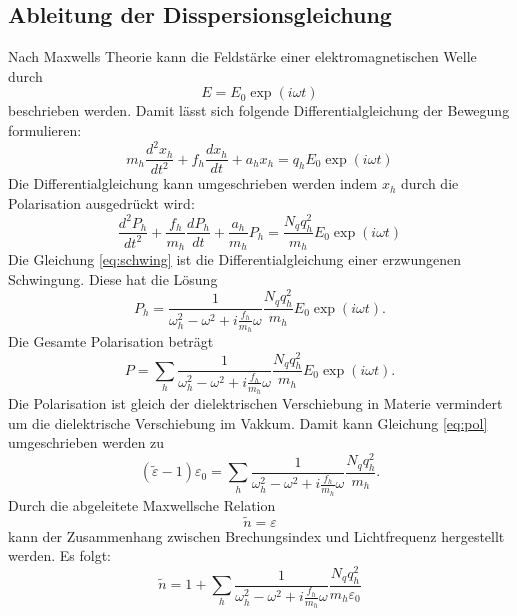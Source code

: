 \subsection{Ableitung der Disspersionsgleichung}
Nach Maxwells Theorie kann die Feldstärke einer elektromagnetischen Welle durch
\begin{equation}
  E = E_0 \exp(i\omega t)
\end{equation}
beschrieben werden.
Damit lässt sich folgende Differentialgleichung der Bewegung formulieren:
\begin{equation}
  m_h \frac{d^2 x_h}{dt^2} +f_h \frac{d x_h}{dt} + a_h x_h = q_h E_0 \exp(i\omega t)
\end{equation}
Die Differentialgleichung kann umgeschrieben werden indem $x_h$ durch die Polarisation ausgedrückt wird:
\begin{equation}
  \label{eq:schwing}
  \frac{d^2 P_h}{dt^2} +\frac{f_h}{m_h} \frac{d P_h}{dt} + \frac{a_h}{m_h} P_h = \frac{N_q q_h^2}{m_h} E_0 \exp(i\omega t) 
\end{equation}
Die Gleichung \eqref{eq:schwing} ist die Differentialgleichung einer erzwungenen Schwingung.
Diese hat die Lösung
\begin{equation}
  P_h =\frac{1}{\omega_h ^2 -\omega ^2 + i\frac{f_h}{m_h}\omega}\frac{N_q q_h^2}{m_h} E_0 \exp(i\omega t) .
\end{equation}
Die Gesamte Polarisation beträgt
\begin{equation}
  \label{eq:pol}
  P=\sum_{h} \frac{1}{\omega_h ^2 -\omega ^2 + i\frac{f_h}{m_h}\omega}\frac{N_q q_h^2}{m_h} E_0 \exp(i\omega t) .
\end{equation}
Die Polarisation ist gleich der dielektrischen Verschiebung in Materie vermindert um die dielektrische Verschiebung im Vakkum.
Damit kann Gleichung \eqref{eq:pol} umgeschrieben werden zu
\begin{equation}
  (\tilde{\varepsilon} -1)\varepsilon_0 = \sum_{h} \frac{1}{\omega_h ^2 -\omega ^2 + i\frac{f_h}{m_h}\omega}\frac{N_q q_h^2}{m_h} .
\end{equation}
Durch die abgeleitete Maxwellsche Relation
\begin{equation}
  \tilde{n}=\varepsilon
\end{equation}
kann der Zusammenhang zwischen Brechungsindex und Lichtfrequenz hergestellt werden.
Es folgt:
\begin{equation}
  \label{eq:n}
  \tilde{n} =  1 + \sum_{h} \frac{1}{\omega_h ^2 -\omega ^2 + i\frac{f_h}{m_h}\omega}\frac{N_q q_h^2}{m_h \varepsilon_0}
\end{equation}
